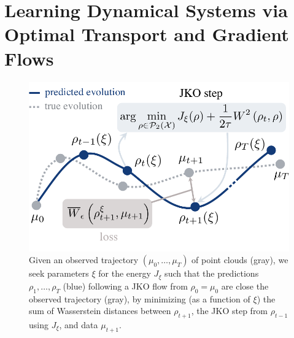 \chapter{Learning Dynamical Systems via Optimal Transport and Gradient Flows}
\label{cha:neural_pde}



\begin{figure}[t]
    \centering
    \includegraphics[width=.9\linewidth]{figures/fig_overview_jkonet.pdf}
    \caption{Given an observed trajectory $(\mu_0,\dots,\mu_T)$ of point clouds (gray), we seek parameters $\xi$ for the energy $J_\xi$ such that the predictions $\rho_1, \dots, \rho_T$ (blue) following a JKO flow from $\rho_0=\mu_0$ are close the observed trajectory (gray), by minimizing (as a function of $\xi$) the sum of Wasserstein distances between $\rho_{t+1}$, the JKO step from $\rho_{t-1}$ using $J_\xi$, and data $\mu_{t+1}$.}
    \label{fig:overview}
\end{figure}


